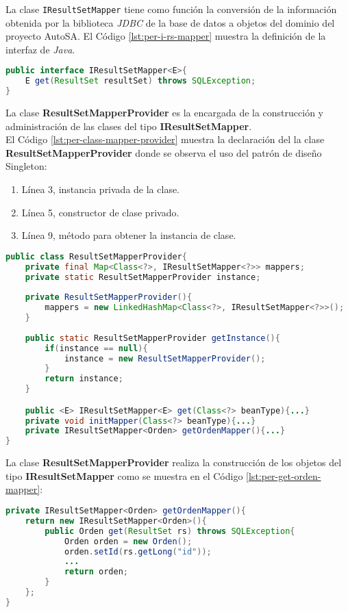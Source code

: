 La clase \texttt{IResultSetMapper} tiene como función la conversión de la información obtenida por la biblioteca \textit{JDBC} de la base de datos a objetos del dominio del proyecto AutoSA. El Código \ref{lst:per-i-rs-mapper} muestra la definición de la interfaz de \textit{Java}.
	\begin{lstlisting}[language=Java, caption={Interfaz IResultSetMapper.}, captionpos=b, label={lst:per-i-rs-mapper}]
public interface IResultSetMapper<E>{
	E get(ResultSet resultSet) throws SQLException;
}
	\end{lstlisting}

La clase \textbf{ResultSetMapperProvider} es la encargada de la construcción y administración de las clases del tipo \textbf{IResultSetMapper}.\\
El Código \ref{lst:per-class-mapper-provider} muestra la declaración del la clase \textbf{ResultSetMapperProvider} donde se observa el uso del patrón de diseño Singleton:
\begin{enumerate}
	\item Línea 3, instancia privada de la clase.
	\item Línea 5, constructor de clase privado.
	\item Línea 9, método para obtener la instancia de clase.
\end{enumerate}

\begin{lstlisting}[language=Java, caption={Clase ResultSetMapperProvider con patrón de diseño Singleton.}, captionpos=b, label={lst:per-class-mapper-provider}]
public class ResultSetMapperProvider{
	private final Map<Class<?>, IResultSetMapper<?>> mappers;
	private static ResultSetMapperProvider instance;
	
	private ResultSetMapperProvider(){
		mappers = new LinkedHashMap<Class<?>, IResultSetMapper<?>>();
	}
	
	public static ResultSetMapperProvider getInstance(){
		if(instance == null){
			instance = new ResultSetMapperProvider();
		}
		return instance;
	}

	public <E> IResultSetMapper<E> get(Class<?> beanType){...}
	private void initMapper(Class<?> beanType){...}
	private IResultSetMapper<Orden> getOrdenMapper(){...}
}
\end{lstlisting}

La clase \textbf{ResultSetMapperProvider} realiza la construcción de los objetos del tipo \textbf{IResultSetMapper} como se muestra en el Código \ref{lst:per-get-orden-mapper}:
\begin{lstlisting}[language=Java, caption={}, captionpos=b, label={lst:per-get-orden-mapper}]
private IResultSetMapper<Orden> getOrdenMapper(){
	return new IResultSetMapper<Orden>(){
		public Orden get(ResultSet rs) throws SQLException{
			Orden orden = new Orden();
			orden.setId(rs.getLong("id"));
			...
			return orden;
		}
	};
}
\end{lstlisting}


